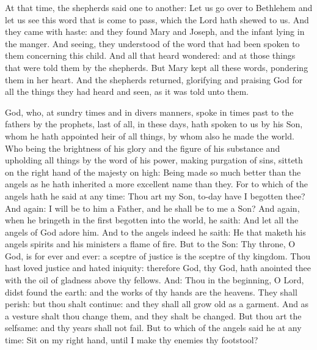 \begin{multicols}{2}
At that time, the
shepherds said one to another: Let us go over to Bethlehem and let us see this
word that is come to pass, which the Lord hath shewed to us.  And they came
with haste: and they found Mary and Joseph, and the infant lying in the manger.
And seeing, they understood of the word that had been spoken to them concerning
this child.  And all that heard wondered: and at those things that were told
them by the shepherds.  But Mary kept all these words, pondering them in her
heart.  And the shepherds returned, glorifying and praising God for all the
things they had heard and seen, as it was told unto them.





God, who, at sundry times and in divers manners, spoke in times past to the
fathers by the prophets, last of all, in these days, hath spoken to us by his
Son, whom he hath appointed heir of all things, by whom also he made the world.
Who being the brightness of his glory and the figure of
his substance and upholding all things by the word of his power, making
purgation of sins, sitteth on the right hand of the majesty on
high: Being made so much better than the angels as he hath inherited a more
excellent name than they.  For to which of the angels hath he said at any time:
Thou art my Son, to-day have I begotten thee? And again: I will be to him a
Father, and he shall be to me a Son?  And again, when he bringeth in the first
begotten into the world, he saith: And let all the angels of God adore him.
And to the angels indeed he saith: He that maketh his angels spirits and his
ministers a flame of fire.  But to the Son: Thy throne, O God, is for ever and
ever: a sceptre of justice is the sceptre of thy kingdom.  Thou hast loved
justice and hated iniquity: therefore God, thy God, hath anointed thee with the
oil of gladness above thy fellows.  And: Thou in the beginning, O Lord, didst
found the earth: and the works of thy hands are the heavens.  They shall
perish: but thou shalt continue: and they shall all grow old as a garment.  And
as a vesture shalt thou change them, and they shalt be changed. But thou art
the selfsame: and thy years shall not fail.  But to which of the angels said he
at any time: Sit on my right hand, until I make thy enemies thy footstool?


\end{multicols}
